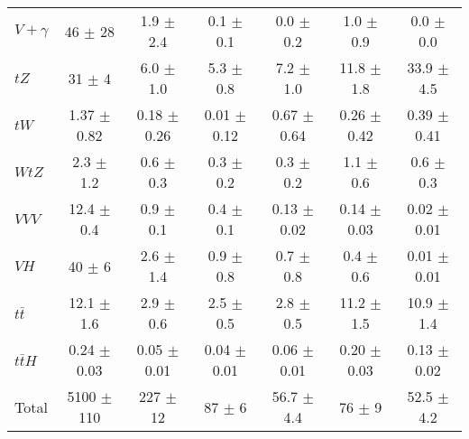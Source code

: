 \begin{tabular}{|l|c|c|c|c|c|c|}
  $V+\gamma$   & 46 $\pm$ 28 & 1.9 $\pm$ 2.4 & 0.1 $\pm$ 0.1 & 0.0 $\pm$ 0.2 & 1.0 $\pm$ 0.9 & 0.0 $\pm$ 0.0 \\ 
  $tZ$   & 31 $\pm$ 4 & 6.0 $\pm$ 1.0 & 5.3 $\pm$ 0.8 & 7.2 $\pm$ 1.0 & 11.8 $\pm$ 1.8 & 33.9 $\pm$ 4.5 \\ 
  $tW$   & 1.37 $\pm$ 0.82 & 0.18 $\pm$ 0.26 & 0.01 $\pm$ 0.12 & 0.67 $\pm$ 0.64 & 0.26 $\pm$ 0.42 & 0.39 $\pm$ 0.41 \\ 
  $WtZ$   & 2.3 $\pm$ 1.2 & 0.6 $\pm$ 0.3 & 0.3 $\pm$ 0.2 & 0.3 $\pm$ 0.2 & 1.1 $\pm$ 0.6 & 0.6 $\pm$ 0.3 \\ 
  $VVV$   & 12.4 $\pm$ 0.4 & 0.9 $\pm$ 0.1 & 0.4 $\pm$ 0.1 & 0.13 $\pm$ 0.02 & 0.14 $\pm$ 0.03 & 0.02 $\pm$ 0.01 \\ 
  $VH$   & 40 $\pm$ 6 & 2.6 $\pm$ 1.4 & 0.9 $\pm$ 0.8 & 0.7 $\pm$ 0.8 & 0.4 $\pm$ 0.6 & 0.01 $\pm$ 0.01 \\ 
  $t\bar{t}$   & 12.1 $\pm$ 1.6 & 2.9 $\pm$ 0.6 & 2.5 $\pm$ 0.5 & 2.8 $\pm$ 0.5 & 11.2 $\pm$ 1.5 & 10.9 $\pm$ 1.4 \\ 
  $t\bar{t}H$   & 0.24 $\pm$ 0.03 & 0.05 $\pm$ 0.01 & 0.04 $\pm$ 0.01 & 0.06 $\pm$ 0.01 & 0.20 $\pm$ 0.03 & 0.13 $\pm$ 0.02 \\ 
\hline 
  Total  & 5100 $\pm$ 110 & 227 $\pm$ 12 & 87 $\pm$ 6 & 56.7 $\pm$ 4.4 & 76 $\pm$ 9 & 52.5 $\pm$ 4.2 \\ 
\hline 
\end{tabular} 
